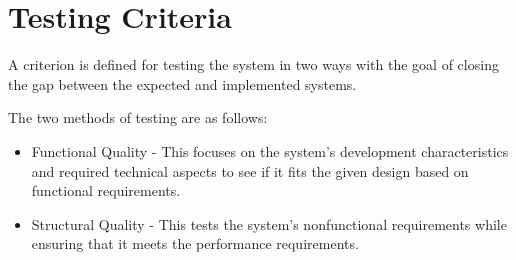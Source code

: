 \section{Testing Criteria}

A criterion is defined for testing the system in two ways with the goal of closing the gap between the expected and implemented systems.

\noindent The two methods of testing are as follows:


 \begin{itemize}[noitemsep,nolistsep]
    \item Functional Quality - This focuses on the system's development characteristics and required technical aspects to see if it fits the given design based on functional requirements.
    \item Structural Quality - This tests the system's nonfunctional requirements while ensuring that it meets the performance requirements.
\end{itemize}